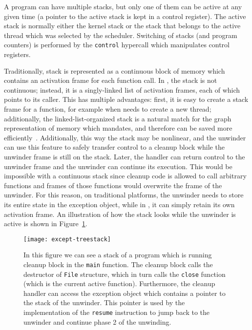 A \divm{} program can have multiple stacks, but only one of them can be
active at any given time (a pointer to the active stack is kept in a
\divm{} control register). The active stack is normally either the kernel
stack or the stack that belongs to the active thread which was selected
by the scheduler. Switching of stacks (and program counters) is
performed by the \texttt{control} hypercall which manipulates \divm{}
control registers.

Traditionally, stack is represented as a continuous block of memory
which contains an activation frame for each function call. In \divm{}, the
stack is not continuous; instead, it is a singly-linked list of
activation frames, each of which points to its caller. This has multiple
advantages: first, it is easy to create a stack frame for a function,
for example when \dios{} needs to create a new thread; additionally, the
linked-list-organized stack is a natural match for the graph
representation of memory which \divm{} mandates, and therefore can be saved
more efficiently~\cite{rockai17:divm}. Additionally, this way the stack
may be nonlinear, and the unwinder can use this feature to safely
transfer control to a cleanup block while the unwinder frame is still on
the stack. Later, the handler can return control to the unwinder frame
and the unwinder can continue its execution. This would be impossible
with a continuous stack since cleanup code is allowed to call arbitrary
functions and frames of those functions would overwrite the frame of the
unwinder. For this reason, on traditional platforms, the unwinder needs
to store its entire state in the exception object, while in \divm{}, it can
simply retain its own activation frame. An illustration of how the stack
looks while the unwinder is active is shown in
Figure~\ref{fig:treestack}.

\begin{figure}
\centering
\texttt{[image: except-treestack]}
\caption{In this figure we can see a stack of a program which is running
cleanup block in the \texttt{main} function. The cleanup block calls the
destructor of \texttt{File} structure, which in turn calls the
\texttt{close} function (which is the current active function).
Furthermore, the cleanup handler can access the exception object which
contains a pointer to the stack of the unwinder. This pointer is used by
the implementation of the \texttt{resume} instruction to jump back to
the unwinder and continue phase 2 of the
unwinding.}\label{fig:treestack}
\end{figure}

